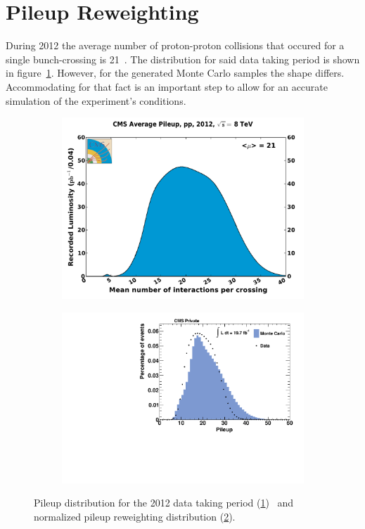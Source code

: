 \section{Pileup Reweighting}
\label{sec:pileup}

During 2012 the average number of proton-proton collisions that occured for a single bunch-crossing is 21~\cite{cmslumi}. The distribution for said data taking period is shown in figure~\ref{fig:pileup2012}. However, for the generated Monte Carlo samples the shape differs. Accommodating for that fact is an important step to allow for an accurate simulation of the experiment's conditions.

\begin{figure}[htb!]
  \centering
  \begin{subfigure}[b]{0.495\textwidth}
    \centering
    \includegraphics[width=\textwidth]{plots/pileup_pp_2012.pdf}
    \caption{\label{fig:pileup2012}}
  \end{subfigure}
  \begin{subfigure}[b]{0.495\textwidth}
    \centering
    \includegraphics[width=\textwidth]{plots/pileup.pdf}
    \caption{\label{fig:pileup}}
  \end{subfigure}
  \caption{Pileup distribution for the 2012 data taking period (\ref{fig:pileup2012})~\cite{cmslumi} and normalized pileup reweighting distribution (\ref{fig:pileup}).}
  \label{fig:pileups}
\end{figure}

